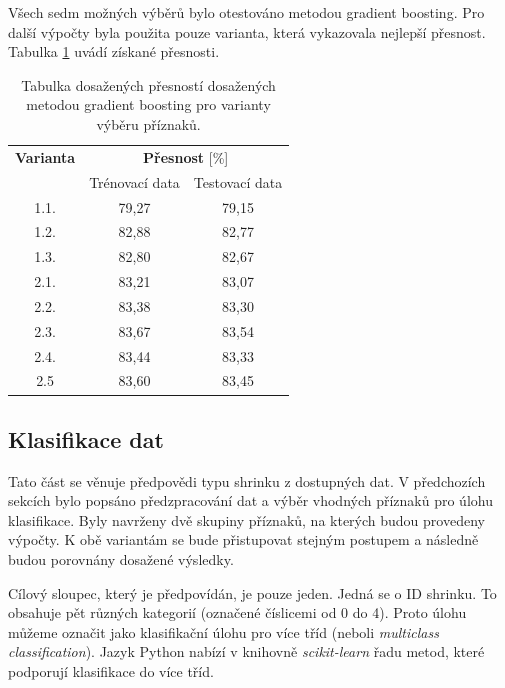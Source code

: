 Všech sedm možných výběrů bylo otestováno metodou gradient boosting. Pro další výpočty byla použita pouze varianta, která vykazovala nejlepší přesnost. Tabulka \ref*{tab:acc-gb} uvádí získané přesnosti.

\begin{table}[hbtp!]
    \centering
    \captionsetup{justification=centering}
    \caption{Tabulka dosažených přesností dosažených metodou gradient boosting pro varianty výběru příznaků.}
    \begin{tabular}{ccc}
    \multicolumn{1}{c}{\textbf{Varianta}} & \multicolumn{2}{c}{\textbf{Přesnost} {[}\%{]}} \\
    \multicolumn{1}{c}{} & \multicolumn{1}{c}{Trénovací data} & \multicolumn{1}{c}{Testovací data} \\
    \hline
    1.1. & 79{,}27                & 79{,}15\\
    1.2. & 82{,}88                & 82{,}77\\
    1.3. & 82{,}80                & 82{,}67\\
    2.1. & 83{,}21                & 83{,}07\\
    2.2. & 83{,}38                & 83{,}30\\
    2.3. & 83{,}67                & 83{,}54\\
    2.4. & 83{,}44                & 83{,}33    \\
    2.5 & 83,60&                    83,45      
    \end{tabular}
    \label{tab:acc-gb}
    \end{table}

\subsection{Klasifikace dat}

Tato část se věnuje předpovědi typu shrinku z dostupných dat. V předchozích sekcích bylo popsáno předzpracování dat a výběr vhodných příznaků pro úlohu klasifikace. Byly navrženy dvě skupiny příznaků, na kterých budou provedeny výpočty. K obě variantám se bude přistupovat stejným postupem a následně budou porovnány dosažené výsledky. 

Cílový sloupec, který je předpovídán, je pouze jeden. Jedná se o ID shrinku. To obsahuje pět různých kategorií (označené číslicemi od 0 do 4). Proto úlohu můžeme označit jako klasifikační úlohu pro více tříd (neboli \emph{multiclass classification}). Jazyk Python nabízí v knihovně \emph{scikit-learn} řadu metod, které podporují klasifikace do více tříd.\cite{bib:scikit-multiclass}

